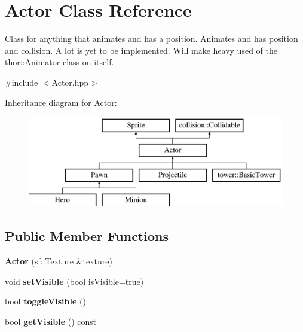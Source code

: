 \hypertarget{class_actor}{}\section{Actor Class Reference}
\label{class_actor}


Class for anything that animates and has a position. Animates and has position and collision. A lot is yet to be implemented. Will make heavy used of the thor\+::\+Animator class on itself.  




{\ttfamily \#include $<$Actor.\+hpp$>$}

Inheritance diagram for Actor\+:\begin{figure}[H]
\begin{center}
\leavevmode
\includegraphics[height=4.000000cm]{class_actor}
\end{center}
\end{figure}
\subsection*{Public Member Functions}
\begin{DoxyCompactItemize}
\item 
\hypertarget{class_actor_a4a5f835c6cb76df32d6d7bee8adfa578}{}{\bfseries Actor} (sf\+::\+Texture \&texture)\label{class_actor_a4a5f835c6cb76df32d6d7bee8adfa578}

\item 
\hypertarget{class_actor_a3d3e6e2264a2ab940fd652329d9f92fb}{}void {\bfseries set\+Visible} (bool is\+Visible=true)\label{class_actor_a3d3e6e2264a2ab940fd652329d9f92fb}

\item 
\hypertarget{class_actor_aacf2f1a5e7758373f14e1bb2ba30bf08}{}bool {\bfseries toggle\+Visible} ()\label{class_actor_aacf2f1a5e7758373f14e1bb2ba30bf08}

\item 
\hypertarget{class_actor_af41b5a4e7b75abccda84648bb2539bd7}{}bool {\bfseries get\+Visible} () const \label{class_actor_af41b5a4e7b75abccda84648bb2539bd7}

\end{DoxyCompactItemize}
